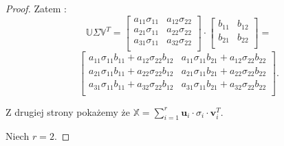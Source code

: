 \documentclass[12pt,a4paper]{report}
\begin{document}
\begin{proof}
Zatem :
$$\mathbb{U} \Sigma \mathbb{V}^T = \left[
        \begin{array}{cc}
         a_{11} \sigma_{11} & a_{12} \sigma_{22}\\
         a_{21} \sigma_{11} & a_{22} \sigma_{22} \\
         a_{31} \sigma_{11} & a_{32} \sigma_{22} \\
         \end{array}
      \right] \cdot \left[
        \begin{array}{cc}
         b_{11} & b_{12}  \\
         b_{21} & b_{22}  \\
         \end{array}
      \right] = 
      $$
      $$\left[
        \begin{array}{cc}
a_{11} \sigma_{11} b_{11} + a_{12} \sigma_{22} b_{12}  & a_{11} \sigma_{11} b_{21} + a_{12} \sigma_{22} b_{22}\\
a_{21} \sigma_{11} b_{11} + a_{22} \sigma_{22} b_{12}  & a_{21} \sigma_{11} b_{21} + a_{22} \sigma_{22} b_{22}\\
a_{31} \sigma_{11} b_{11} + a_{32} \sigma_{22} b_{12}  & a_{31} \sigma_{11} b_{21} + a_{32} \sigma_{22} b_{22}\\
         \end{array}
      \right].$$
      
Z drugiej strony pokażemy że $\mathbb{X} = \sum_{i=1}^r \mathbf{u}_i \cdot\sigma_i \cdot \mathbf{v}_i^T$.

Niech $r=2$.


\end{proof}
\end{document}

